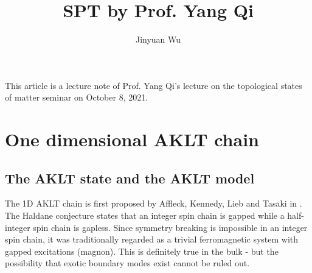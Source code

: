 \documentclass[hyperref, a4paper]{article}
\title{SPT by Prof. Yang Qi}
\author{Jinyuan Wu}
\begin{document}
\maketitle

This article is a lecture note of Prof. Yang Qi's lecture on the topological states of matter seminar on October 8, 2021.

\section{One dimensional AKLT chain}

\subsection{The AKLT state and the AKLT model}

The 1D AKLT chain is first proposed by Affleck, Kennedy, Lieb and Tasaki in \cite{Affleck_1987}.
The Haldane conjecture states that an integer spin chain is gapped while a half-integer spin chain is gapless.
Since symmetry breaking is impossible in an integer spin chain, it was traditionally regarded as a trivial ferromagnetic system with gapped excitations (magnon).
This is definitely true in the bulk - but the possibility that exotic boundary modes exist cannot be ruled out.
\end{document}
